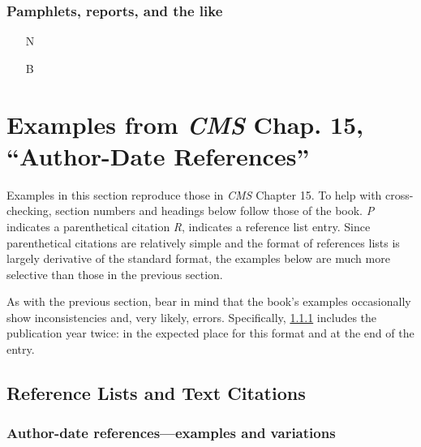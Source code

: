 \documentclass[11pt,letterpaper,oneside]{article}
\begin{document}


\setcounter{subsubsection}{248}
\subsubsection{Pamphlets, reports, and the like}

\begin{itemize}
\item[N] 

\item[B] 
\end{itemize}

\section{Examples from \emph{CMS} Chap. 15, ``Author-Date
References''}
\label{paren16}

Examples in this section reproduce those in \textit{CMS} Chapter 15.
To help with cross-checking, section numbers and headings below follow
those of the book. \textit{P} indicates a parenthetical citation
\textit{R}, indicates a reference list entry. Since parenthetical
citations are relatively simple and the format of references lists is
largely derivative of the standard format, the examples below are much
more selective than those in the previous section.

As with the previous section, bear in mind that the book's examples
occasionally show inconsistencies and, very likely, errors.
Specifically, \ref{15.9} includes the publication year twice: in the
expected place for this format and at the end of the entry.

\subsection{Reference Lists and Text Citations}
\setcounter{subsection}{15}

\setcounter{subsubsection}{8}
\subsubsection{Author-date references---examples and variations}
\label{15.9}
\end{document}
